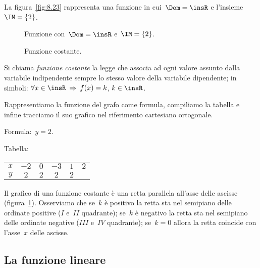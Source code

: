 La figura~\ref{fig:8.23} rappresenta una funzione in cui~$\Dom=\insR$ e l'insieme~$\IM=\{2\}$.

\begin{figure}[h]
 \begin{minipage}[b]{.50\textwidth}
  \centering
  \caption{Funzione con~$\Dom=\insR$ e~$\IM=\{2\}$.}\label{fig:8.23}
 \end{minipage}\hfil
 \begin{minipage}[b]{.4\textwidth}
  \centering
  \caption{Funzione costante.}\label{fig:8.24}
 \end{minipage}
\end{figure}

\begin{definizione}
Si chiama \emph{funzione costante} la legge che associa ad ogni valore assunto dalla variabile indipendente sempre lo stesso valore
della variabile dipendente; in simboli: $\forall x\in \insR \:\Rightarrow\: f(x)=k$, $k\in \insR$.
\end{definizione}

Rappresentiamo la funzione del grafo come formula, compiliamo la tabella e infine tracciamo il suo grafico
nel riferimento cartesiano ortogonale.

Formula:~$y=2$.

Tabella:
\begin{center}
 \begin{tabular}{cccccc}
 \toprule
 $x$ & $-2$ & $0$ & $-3$ & $1$ & $2$ \\
 $y$ & $2$ & $2$ & $2$ & $2$ &  \\
 \bottomrule
 \end{tabular}
\end{center}

Il grafico di una funzione costante è una retta parallela all'asse delle ascisse (figura~\ref{fig:8.24}).
Osserviamo che se~$k$ è positivo la retta sta nel semipiano delle ordinate positive ($I$ e~$II$ quadrante);
se~$k$ è negativo la retta sta nel semipiano delle ordinate negative ($III$ e~$IV$ quadrante);
se~$k=0$ allora la retta coincide con l'asse~$x$ delle ascisse.

\vspazio\ovalbox{\risolvii \ref{ese:\thechapter.46}, \ref{ese:\thechapter.47}, \ref{ese:\thechapter.48}, \ref{ese:\thechapter.49}}
\pagebreak
\subsection{La funzione lineare}

